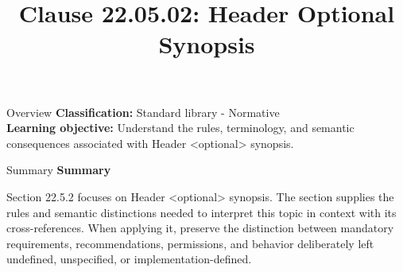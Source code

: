 \documentclass[10pt,letterpaper]{article}
\title{Clause 22.05.02: Header Optional Synopsis}
\author{}
\date{}
\begin{document}
\maketitle
\begin{CornellOverviewBox}{Overview}
\textbf{Classification:} Standard library - Normative\\[2pt]
\textbf{Learning objective:} Understand the rules, terminology, and semantic consequences associated with Header <optional> synopsis.
\end{CornellOverviewBox}\begin{CornellSummaryBox}{Summary}
{\sffamily\bfseries\color{Accent} Summary}\par\vspace{3pt}Section 22.5.2 focuses on Header <optional> synopsis. The section supplies the rules and semantic distinctions needed to interpret this topic in context with its cross-references. When applying it, preserve the distinction between mandatory requirements, recommendations, permissions, and behavior deliberately left undefined, unspecified, or implementation-defined.
\end{CornellSummaryBox}
\end{document}
